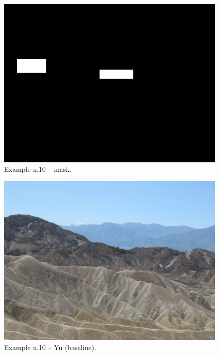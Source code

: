 \documentclass[a4paper, 11pt]{article}
\begin{document}
\begin{figure}
    \centering
    \includegraphics[width=.95\linewidth]{documentation/img/masks/0114_mask.png}
    \caption{Example n.10 -- mask.}
    \label{img:ex_n.10_mask}
\end{figure}
\begin{figure}
    \centering
    \includegraphics[width=.95\linewidth]{documentation/img/baseline/0114.png}
    \caption{Example n.10 -- Yu (baseline).}
    \label{img:ex_n.10_mask}
\end{figure}
\end{document}
